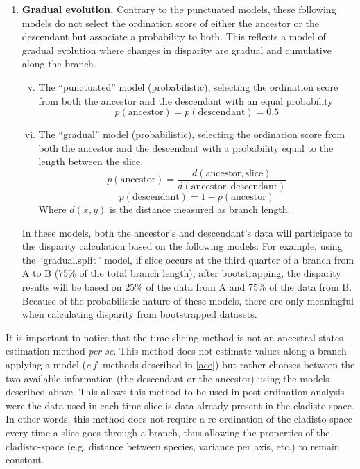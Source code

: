 \documentclass[12pt,a4paper]{article}
\begin{document}
\begin{enumerate}
    \item{\textbf{Gradual evolution.}}
    Contrary to the punctuated models, these following models do not select the ordination score of either the ancestor or the descendant but associate a probability to both.
    This reflects a model of gradual evolution where changes in disparity are gradual and cumulative along the branch.

    \begin{enumerate}[(i)]
    \setcounter{enumii}{4}
      \item The ``punctuated'' model (probabilistic), selecting the ordination score from both the ancestor and the descendant with an equal probability
          \begin{equation}
          p(\text{ancestor}) = p(\text{descendant}) = 0.5
          \end{equation}

    \item The ``gradual'' model (probabilistic), selecting the ordination score from both the ancestor and the descendant with a probability equal to the length between the slice.
          \begin{equation}
              p(\text{ancestor}) = \frac{d(\text{ancestor},\text{slice})}{d(\text{ancestor},\text{descendant})}
          \end{equation}
          \begin{equation}
              p(\text{descendant}) = 1 - p(\text{ancestor})
          \end{equation}
    \noindent Where $d(x,y)$ is the distance measured as branch length.
    \end{enumerate}

    In these models, both the ancestor's and descendant's data will participate to the disparity calculation based on the following models:
    For example, using the ``gradual.split'' model, if slice occurs at the third quarter of a branch from A to B (75\% of the total branch length), after bootstrapping, the disparity results will be based on 25\% of the data from A and 75\% of the data from B.
    Because of the probabilistic nature of these models, there are only meaningful when calculating disparity from bootstrapped datasets.
\end{enumerate}

It is important to notice that the time-slicing method is not an ancestral states estimation method \textit{per se}.
This method does not estimate values along a branch applying a model (\textit{c.f.} methods described in \ref{ace}) but rather chooses between the two available information (the descendant or the ancestor) using the models described above.
This allows this method to be used in post-ordination analysis were the data used in each time slice is data already present in the cladisto-space.
In other words, this method does not require a re-ordination of the cladisto-space every time a slice goes through a branch, thus allowing the properties of the cladisto-space (e.g. distance between species, variance per axis, etc.) to remain constant.
\end{document}

